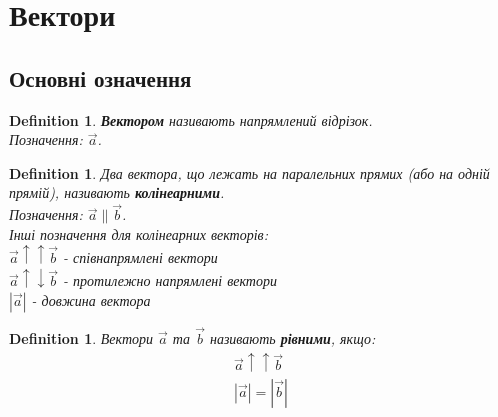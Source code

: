 \documentclass[a4paper, 10pt]{extarticle}
\theoremstyle{theoremdd}
\theoremstyle{theoremdd}
\newtheorem{definition}[theorem]{Definition}
\theoremstyle{theoremdd}
\theoremstyle{theoremdd}
\theoremstyle{theoremdd}
\theoremstyle{theoremdd}
\theoremstyle{theoremdd}
\theoremstyle{theoremdd}
\begin{document}
\tableofcontents
\newpage
	
\section{Вектори}
\subsection{Основні означення}
\begin{definition}
\textbf{Вектором} називають напрямлений відрізок.\\
Позначення: $\vec{a}$.
\begin{figure}[h]
\centering
{}
\end{figure}
\end{definition}

\begin{definition}
Два вектора, що лежать на паралельних прямих (або на одній прямій), називають \textbf{колінеарними}.\\
Позначення: $\vec{a} \parallel \vec{b}$.\\
Інші позначення для колінеарних векторів: \\ 
$\vec{a} \uparrow \uparrow \vec{b}$ - співнапрямлені вектори\\
$\vec{a} \uparrow \downarrow \vec{b}$ - протилежно напрямлені вектори
\bigskip \\
$|\vec{a}|$ - довжина вектора
\end{definition}

\begin{definition}
Вектори $\vec{a}$ та $\vec{b}$ називають \textbf{рівними}, якщо:
	\begin{align*}
	\vec{a} \uparrow \uparrow \vec{b} \\
	|\vec{a}| = |\vec{b}|
	\end{align*}
\end{definition}
\end{document}
